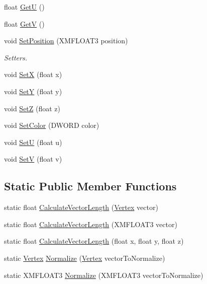 \begin{DoxyCompactItemize}
\item 
float \hyperlink{class_vertex_ada06e4d8d0f06652cb3b6a06776e1069}{GetU} ()
\item 
float \hyperlink{class_vertex_a05e50625839f1ce7b35574cdf443d64e}{GetV} ()
\item 
void \hyperlink{class_vertex_aa4c230ebaa8a0c0a8ca6a1e29d5ae93e}{Set\+Position} (X\+M\+F\+L\+O\+A\+T3 position)
\begin{DoxyCompactList}\small\item\em Setters. \end{DoxyCompactList}\item 
void \hyperlink{class_vertex_a05956877b676ad982b5e706ce726e44a}{SetX} (float x)
\item 
void \hyperlink{class_vertex_ad8b8b10e8e2f617c61be74aa50464293}{SetY} (float y)
\item 
void \hyperlink{class_vertex_ab488ce5e53970ae1172ba49417d85b07}{SetZ} (float z)
\item 
void \hyperlink{class_vertex_a5febdb33567ab2a7f06fc85a2614d526}{Set\+Color} (D\+W\+O\+RD color)
\item 
void \hyperlink{class_vertex_aebfd289c47c2c19c5655e0ccf1dac72f}{SetU} (float u)
\item 
void \hyperlink{class_vertex_a429f3b9b25ba1f58e09bfcf12c1029b6}{SetV} (float v)
\end{DoxyCompactItemize}
\subsection*{Static Public Member Functions}
\begin{DoxyCompactItemize}
\item 
static float \hyperlink{class_vertex_a6d31c2682560aaf39b12be7085f8a15d}{Calculate\+Vector\+Length} (\hyperlink{class_vertex}{Vertex} vector)
\item 
static float \hyperlink{class_vertex_a9aa994d5edcc65c5114142a818559098}{Calculate\+Vector\+Length} (X\+M\+F\+L\+O\+A\+T3 vector)
\item 
static float \hyperlink{class_vertex_a1f78e29eef1efb38d9bf6234e6d51a82}{Calculate\+Vector\+Length} (float x, float y, float z)
\item 
static \hyperlink{class_vertex}{Vertex} \hyperlink{class_vertex_a8ddc8aebbcc4226698bd2c85730f7748}{Normalize} (\hyperlink{class_vertex}{Vertex} vector\+To\+Normalize)
\item 
static X\+M\+F\+L\+O\+A\+T3 \hyperlink{class_vertex_a8080cc17ccbad289de853b6c8d53d416}{Normalize} (X\+M\+F\+L\+O\+A\+T3 vector\+To\+Normalize)
\end{DoxyCompactItemize}
